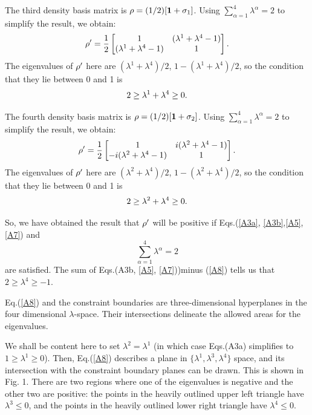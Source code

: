 \documentclass[aps,pra,amssymb, amsfonts,amsmath,showpacs, superscriptaddress,12pt]{revtex4}
\begin{document}
\begin{appendix}
The third density basis matrix is ${\bf\rho}=(1/2)[{\bf 1}+{\bf \sigma}_{1}]$.  Using $\sum_{\alpha=1}^{4}\lambda^{\alpha}=2$ to simplify the result, we obtain:
\begin{equation}\label{A4}
{\bf \rho}'
=\frac{1}{2}\begin{bmatrix}1&(\lambda^{1}+\lambda^{4}-1)\\
(\lambda^{1}+\lambda^{4}-1)&1
\end{bmatrix}.
\end{equation}
The eigenvalues of ${\bf \rho}'$  here are $(\lambda^{1}+\lambda^{4})/2$, $1-(\lambda^{1}+\lambda^{4})/2$, so the condition that they lie between 0 and 1 is
 \begin{equation}\label{A5}
2\geq\lambda^{1}+\lambda^{4}\geq 0\\.
\end{equation}

The fourth density basis matrix is ${\bf\rho}=(1/2)[{\bf 1}+{\bf \sigma}_{2}]$.  Using $\sum_{\alpha=1}^{4}\lambda^{\alpha}=2$ to simplify the result, we obtain:
\begin{equation}\label{A6}
{\bf \rho}'
=\frac{1}{2}\begin{bmatrix}1&i(\lambda^{2}+\lambda^{4}-1)\\
-i(\lambda^{2}+\lambda^{4}-1)&1
\end{bmatrix}.
\end{equation}
The eigenvalues of ${\bf \rho}'$  here are $(\lambda^{2}+\lambda^{4})/2$, $1-(\lambda^{2}+\lambda^{4})/2$, so the condition that they lie between 0 and 1 is
 \begin{equation}\label{A7}
2\geq\lambda^{2}+\lambda^{4}\geq 0\\.
\end{equation}
 

So, we have obtained the result that ${\bf \rho}'$ will  be positive if Eqs.(\ref{A3a}, \ref{A3b},\ref{A5},\ref{A7}) and 
\begin{equation}\label{A8}
\sum_{\alpha=1}^{4}\lambda^{\alpha}=2
\end{equation}
\noindent  are satisfied.  The sum of  Eqs.(A3b, \ref{A5}, \ref{A7}))minus (\ref{A8}) tells us that $2\geq \lambda^{4}\geq -1$. 

 Eq.(\ref{A8}) and the constraint boundaries  are  three-dimensional hyperplanes in the four dimensional $\lambda$-space.
  Their intersections delineate the allowed areas for the eigenvalues.  
 
 We shall be content here to set $\lambda^{2}=\lambda^{1}$ (in which case 
 Eqs.(A3a) simplifies to $1\geq \lambda^{1}\geq 0$). Then, 
 Eq.(\ref{A8}) describes a plane in $\{\lambda^{1},\lambda^{3}, \lambda^{4}\}$ space, and its intersection with the 
 constraint boundary planes can be drawn.  This is shown in Fig. 1. There are two regions where one of the eigenvalues is negative and the other two are positive:  the points in the heavily outlined upper left triangle have $\lambda^{3}\leq 0$, and 
 the points in the heavily outlined lower right triangle have $\lambda^{4}\leq 0$.
 

\end{appendix}
\end{document}
